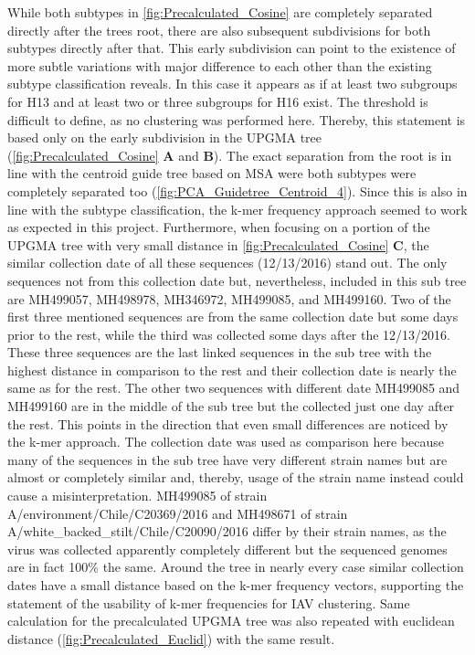 While both subtypes in \autoref{fig:Precalculated_Cosine} are completely separated directly after the trees root, there are also subsequent subdivisions for both subtypes directly after that. This early subdivision can point to the existence of more subtle variations with major difference to each other than the existing subtype classification reveals. In this case it appears as if at least two subgroups for H13 and at least two or three subgroups for H16 exist. The threshold is difficult to define, as no clustering was performed here. Thereby, this statement is based only on the early subdivision in the \gls{UPGMA} tree (\autoref{fig:Precalculated_Cosine} \textbf{\textsf{A}} and \textbf{\textsf{B}}). The exact separation from the root is in line with the centroid guide tree based on \gls{MSA} were both subtypes were completely separated too (\autoref{fig:PCA_Guidetree_Centroid_4}). Since this is also in line with the subtype classification, the k-mer frequency approach seemed to work as expected in this project. Furthermore, when focusing on a portion of the \gls{UPGMA} tree with very small distance in \autoref{fig:Precalculated_Cosine} \textbf{\textsf{C}}, the similar collection date of all these sequences (12/13/2016) stand out. The only sequences not from this collection date but, nevertheless, included in this sub tree are MH499057, MH498978, MH346972, MH499085, and MH499160. Two of the first three mentioned sequences are from the same collection date but some days prior to the rest, while the third was collected some days after the 12/13/2016. These three sequences are the last linked sequences in the sub tree with the highest distance in comparison to the rest and their collection date is nearly the same as for the rest. The other two sequences with different date MH499085 and MH499160 are in the middle of the sub tree but the collected just one day after the rest. This points in the direction that even small differences are noticed by the k-mer approach. The collection date was used as comparison here because many of the sequences in the sub tree have very different strain names but are almost or completely similar and, thereby, usage of the strain name instead could cause a misinterpretation. MH499085 of strain A/environment/Chile/C20369/2016 and MH498671 of strain A/white\_backed\_stilt/Chile/C20090/2016 differ by their strain names, as the virus was collected apparently completely different but the sequenced genomes are in fact 100\% the same. Around the tree in nearly every case similar collection dates have a small distance based on the k-mer frequency vectors, supporting the statement of the usability of k-mer frequencies for \gls{IAV} clustering. Same calculation for the precalculated \gls{UPGMA} tree was also repeated with euclidean distance (\autoref{fig:Precalculated_Euclid}) with the same result.

